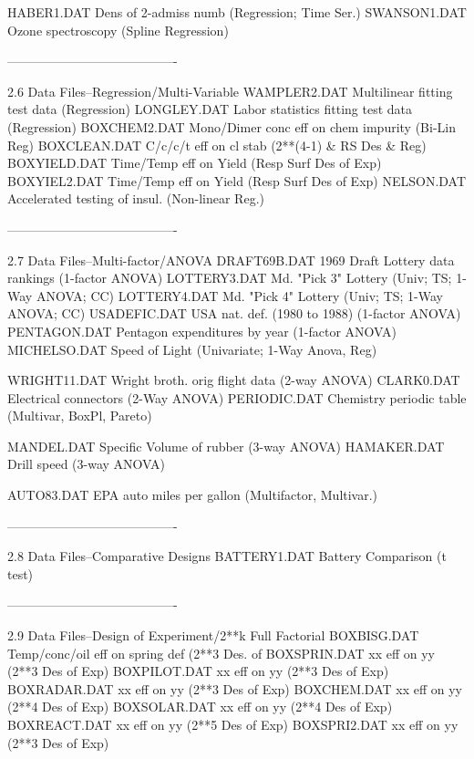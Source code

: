       HABER1.DAT    Dens of 2-admiss numb (Regression; Time Ser.)
      SWANSON1.DAT  Ozone spectroscopy (Spline Regression)
 
 
 
 
----------------------------------------
 
2.6
Data Files--Regression/Multi-Variable
      WAMPLER2.DAT  Multilinear fitting test data (Regression)
      LONGLEY.DAT   Labor statistics fitting test data (Regression)
      BOXCHEM2.DAT  Mono/Dimer conc eff on chem impurity (Bi-Lin Reg)
      BOXCLEAN.DAT  C/c/c/t eff on cl stab (2**(4-1) & RS Des & Reg)
      BOXYIELD.DAT  Time/Temp eff on Yield (Resp Surf Des of Exp)
      BOXYIEL2.DAT  Time/Temp eff on Yield (Resp Surf Des of Exp)
      NELSON.DAT    Accelerated testing of insul. (Non-linear Reg.)
 
 
 
 
----------------------------------------
 
2.7
Data Files--Multi-factor/ANOVA
      DRAFT69B.DAT  1969 Draft Lottery data rankings (1-factor ANOVA)
      LOTTERY3.DAT  Md. "Pick 3" Lottery (Univ; TS; 1-Way ANOVA; CC)
      LOTTERY4.DAT  Md. "Pick 4" Lottery (Univ; TS; 1-Way ANOVA; CC)
      USADEFIC.DAT  USA nat. def. (1980 to 1988) (1-factor ANOVA)
      PENTAGON.DAT  Pentagon expenditures by year (1-factor ANOVA)
      MICHELSO.DAT  Speed of Light (Univariate; 1-Way Anova, Reg)
 
      WRIGHT11.DAT  Wright broth. orig flight data (2-way ANOVA)
      CLARK0.DAT    Electrical connectors (2-Way ANOVA)
      PERIODIC.DAT  Chemistry periodic table (Multivar, BoxPl, Pareto)
 
      MANDEL.DAT    Specific Volume of rubber (3-way ANOVA)
      HAMAKER.DAT   Drill speed (3-way ANOVA)
 
      AUTO83.DAT    EPA auto miles per gallon (Multifactor, Multivar.)
 
 
 
----------------------------------------
 
2.8
Data Files--Comparative Designs
      BATTERY1.DAT  Battery Comparison (t test)
 
 
 
 
----------------------------------------
 
2.9
Data Files--Design of Experiment/2**k Full Factorial
      BOXBISG.DAT   Temp/conc/oil eff on spring def (2**3 Des. of
      BOXSPRIN.DAT  xx eff on yy (2**3 Des of Exp)
      BOXPILOT.DAT  xx eff on yy (2**3 Des of Exp)
      BOXRADAR.DAT  xx eff on yy (2**3 Des of Exp)
      BOXCHEM.DAT   xx eff on yy (2**4 Des of Exp)
      BOXSOLAR.DAT  xx eff on yy (2**4 Des of Exp)
      BOXREACT.DAT  xx eff on yy (2**5 Des of Exp)
      BOXSPRI2.DAT  xx eff on yy (2**3 Des of Exp)
 
